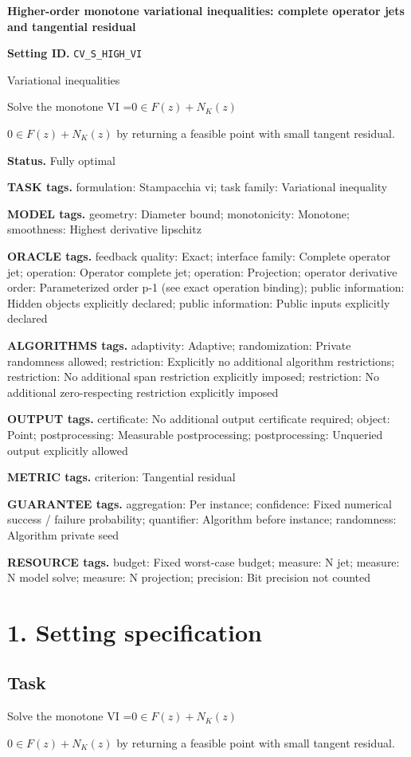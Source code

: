 \documentclass[10pt,a4paper]{article}
\newcommand{\AtlasMath}[1]{\par\begingroup\centering\setbox0=\hbox{$\displaystyle #1$}\ifdim\wd0>1.4\linewidth\typeout{ATLAS WIDE FORMULA: \the\wd0}\fi\ifdim\wd0>\linewidth\resizebox{\linewidth}{!}{\box0}\else\box0\fi\par\endgroup}
\newcommand{\AtlasInlineMath}[1]{\begingroup\setbox0=\hbox{$#1$}\ifdim\wd0>.4\linewidth\endgroup\AtlasMath{#1}\else\endgroup$#1$\fi}
\begin{document}
\raggedright

{\LARGE\bfseries\sffamily\color{AtlasNavy} Higher-order monotone variational inequalities: complete operator jets and tangential residual\par}\vspace{5pt}
\textbf{Setting ID.} \texttt{CV\_\allowbreak{}S\_\allowbreak{}HIGH\_\allowbreak{}VI}

Variational inequalities

Solve the monotone VI \AtlasInlineMath{0\in F(z)+N_K(z)} by returning a feasible point with small tangent residual.

\textbf{Status.} Fully optimal

\textbf{TASK tags.} formulation: Stampacchia vi; task family: Variational inequality

\textbf{MODEL tags.} geometry: Diameter bound; monotonicity: Monotone; smoothness: Highest derivative lipschitz

\textbf{ORACLE tags.} feedback quality: Exact; interface family: Complete operator jet; operation: Operator complete jet; operation: Projection; operator derivative order: Parameterized order p-1 (see exact operation binding); public information: Hidden objects explicitly declared; public information: Public inputs explicitly declared

\textbf{ALGORITHMS tags.} adaptivity: Adaptive; randomization: Private randomness allowed; restriction: Explicitly no additional algorithm restrictions; restriction: No additional span restriction explicitly imposed; restriction: No additional zero-respecting restriction explicitly imposed

\textbf{OUTPUT tags.} certificate: No additional output certificate required; object: Point; postprocessing: Measurable postprocessing; postprocessing: Unqueried output explicitly allowed

\textbf{METRIC tags.} criterion: Tangential residual

\textbf{GUARANTEE tags.} aggregation: Per instance; confidence: Fixed numerical success / failure probability; quantifier: Algorithm before instance; randomness: Algorithm private seed

\textbf{RESOURCE tags.} budget: Fixed worst-case budget; measure: N jet; measure: N model solve; measure: N projection; precision: Bit precision not counted

\section{1. Setting specification}
\subsection{Task}
Solve the monotone VI \AtlasInlineMath{0\in F(z)+N_K(z)} by returning a feasible point with small tangent residual.
\end{document}
